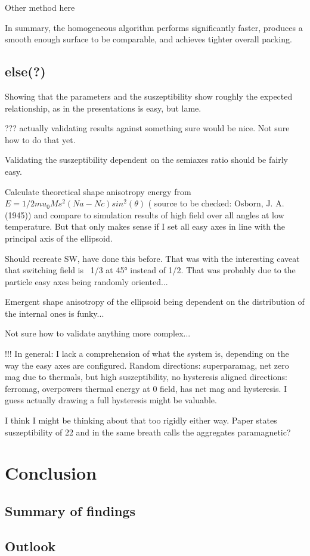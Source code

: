 \documentclass[12pt, DIV=12]{scrartcl}
\begin{document}
Other method here

In summary, the homogeneous algorithm performs significantly faster, produces a smooth enough surface to be comparable, and achieves tighter overall packing.

\subsection{else(?)}

Showing that the parameters and the suszeptibility show roughly the expected relationship, as in the presentations is easy, but lame.

??? actually validating results against something sure would be nice. Not sure how to do that yet.

Validating the suszeptibility dependent on the semiaxes ratio should be fairly easy.

Calculate theoretical shape anisotropy energy from $E=1/2mu_0Ms^2(Na-Nc)sin^2(\theta)$ ( source to be checked: Osborn, J. A. (1945)) and compare to simulation results of high field over all angles at low temperature.
But that only makes sense if I set all easy axes in line with the principal axis of the ellipsoid.

Should recreate SW, have done this before. That was with the interesting caveat that switching field is ~1/3 at 45° instead of 1/2. That was probably due to the particle easy axes being randomly oriented...

Emergent shape anisotropy of the ellipsoid being dependent on the distribution of the internal ones is funky...

Not sure how to validate anything more complex...

!!! In general: I lack a comprehension of what the system is, depending on the way the easy axes are configured.
Random directions: superparamag, net zero mag due to thermals, but high suszeptibility, no hysteresis
aligned directions: ferromag, overpowers thermal energy at 0 field, has net mag and hysteresis.
I guess actually drawing a full hysteresis might be valuable.

I think I might be thinking about that too rigidly either way.
Paper states suszeptibility of 22 and in the same breath calls the aggregates paramagnetic?

\section{Conclusion}
\subsection{Summary of findings}
\subsection{Outlook}

\newpage



\end{document}

